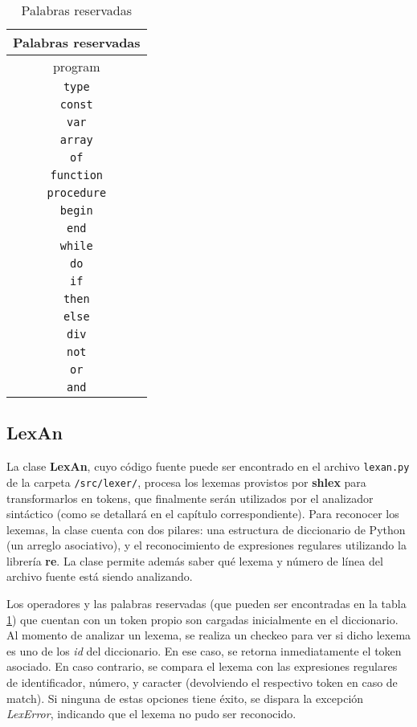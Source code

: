 \documentclass[a4paper,oneside]{report}
\begin{document}
\begin{table}[htbc]
\centering
\begin{tabular}{|c|}
\hline
\textbf{Palabras reservadas} \\  \hline
\ttfamily
program \\ 
\texttt{type} \\ 
\texttt{const} \\ 
\texttt{var} \\ 
\texttt{array} \\ 
\texttt{of} \\ 
\texttt{function} \\ 
\texttt{procedure} \\ 
\texttt{begin} \\ 
\texttt{end} \\ 
\texttt{while} \\ 
\texttt{do} \\ 
\texttt{if} \\ 
\texttt{then} \\ 
\texttt{else} \\ 
\texttt{div} \\ 
\texttt{not} \\ 
\texttt{or} \\ 
\texttt{and} \\ 
\hline
\end{tabular}
\label{tab:palabras}
\caption{Palabras reservadas}
\end{table}


\subsection{LexAn}

La clase {\bf LexAn}, cuyo código fuente puede ser encontrado en el archivo \texttt{lexan.py} de la carpeta \texttt{/src/lexer/}, procesa los lexemas provistos por {\bf shlex} para transformarlos en tokens, que finalmente serán utilizados por el analizador sintáctico (como se detallará en el capítulo correspondiente). Para reconocer los lexemas, la clase cuenta con dos pilares: una estructura de diccionario de Python (un arreglo asociativo), y el reconocimiento de expresiones regulares utilizando la librería {\bf re}. La clase permite además saber qué lexema y número de línea del archivo fuente está siendo analizando.

Los operadores y las palabras reservadas (que pueden ser encontradas en la tabla \ref{tab:palabras}) que cuentan con un token propio son cargadas inicialmente en el diccionario. Al momento de analizar un lexema, se realiza un checkeo para ver si dicho lexema es uno de los \textit{id} del diccionario. En ese caso, se retorna inmediatamente el token asociado. En caso contrario, se compara el lexema con las expresiones regulares de identificador, número, y caracter (devolviendo el respectivo token en caso de match). Si ninguna de estas opciones tiene éxito, se dispara la excepción \textit{LexError}, indicando que el lexema no pudo ser reconocido.
\end{document}
